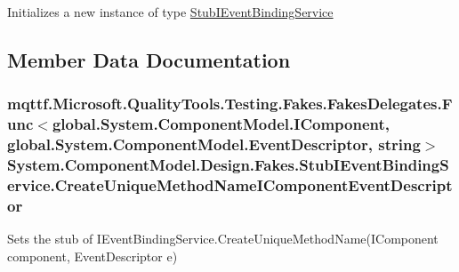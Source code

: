 Initializes a new instance of type \hyperlink{class_system_1_1_component_model_1_1_design_1_1_fakes_1_1_stub_i_event_binding_service}{Stub\-I\-Event\-Binding\-Service}



\subsection{Member Data Documentation}
\hypertarget{class_system_1_1_component_model_1_1_design_1_1_fakes_1_1_stub_i_event_binding_service_a7e316675a07f17bef42c49d9b11aef01}{
\subsubsection[{Create\-Unique\-Method\-Name\-I\-Component\-Event\-Descriptor}]{\setlength{\rightskip}{0pt plus 5cm}mqttf.\-Microsoft.\-Quality\-Tools.\-Testing.\-Fakes.\-Fakes\-Delegates.\-Func$<$global.\-System.\-Component\-Model.\-I\-Component, global.\-System.\-Component\-Model.\-Event\-Descriptor, string$>$ System.\-Component\-Model.\-Design.\-Fakes.\-Stub\-I\-Event\-Binding\-Service.\-Create\-Unique\-Method\-Name\-I\-Component\-Event\-Descriptor}}\label{class_system_1_1_component_model_1_1_design_1_1_fakes_1_1_stub_i_event_binding_service_a7e316675a07f17bef42c49d9b11aef01}


Sets the stub of I\-Event\-Binding\-Service.\-Create\-Unique\-Method\-Name(\-I\-Component component, Event\-Descriptor e)

